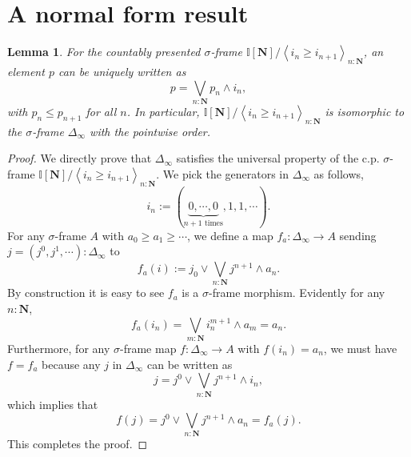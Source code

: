 \documentclass[12pt]{amsart}
\newtheorem{lemma}[theorem]{Lemma}
\theoremstyle{definition}
\newcommand{\mb}[1]{\mathbf{#1}}
\newcommand{\mbb}[1]{\mathbb{#1}}
\newcommand{\I}{\mbb I}
\newcommand{\pair}[1]{\left\langle#1\right\rangle}
\newcommand{\N}{\mb N}
\begin{document}
\appendix

\section{A normal form result}

\begin{lemma}\label{app:normalsigma}
  For the countably presented $\sigma$-frame $\I[\N]/\pair{i_n \ge i_{n+1}}_{n:\N}$, an element $p$ can be uniquely written as 
  \[ p = \bigvee_{n:\N} p_n \wedge i_n, \]
  with $p_n \le p_{n+1}$ for all $n$. In particular, $\I[\N]/\pair{i_n \ge i_{n+1}}_{n:\N}$ is isomorphic to the $\sigma$-frame $\Delta_\infty$ with the pointwise order.
\end{lemma}
\begin{proof}
  We directly prove that $\Delta_\infty$ satisfies the universal property of the c.p. $\sigma$-frame $\I[\N]/\pair{i_n \ge i_{n+1}}_{n:\N}$. We pick the generators in $\Delta_\infty$ as follows,
  \[ i_n := (\underbrace{0,\cdots,0}_{n+1 \text{ times}},1,1,\cdots). \]
  For any $\sigma$-frame $A$ with $a_0 \ge a_1 \ge \cdots$, we define a map $f_a : \Delta_\infty \to A$ sending $j = (j^0,j^1,\cdots) : \Delta_\infty$ to
  \[ f_a(i) := j_0 \vee \bigvee_{n:\N} j^{n+1} \wedge a_{n}. \]
  By construction it is easy to see $f_a$ is a $\sigma$-frame morphism. Evidently for any $n : \N$, 
  \[ f_a(i_n) = \bigvee_{m:\N} i_n^{m+1} \wedge a_m = a_n. \]
  Furthermore, for any $\sigma$-frame map $f : \Delta_\infty \to A$ with $f(i_n) = a_n$, we must have $f = f_a$ because any $j$ in $\Delta_\infty$ can be written as
  \[ j = j^0 \vee \bigvee_{n:\N} j^{n+1} \wedge i_n, \]
  which implies that
  \[ f(j) = j^0 \vee \bigvee_{n:\N}j^{n+1} \wedge a_n = f_a(j). \]
  This completes the proof.
\end{proof}




\end{document}
